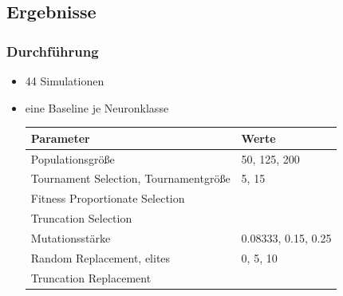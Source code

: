 \subsection{Ergebnisse}

\begin{frame}
  \frametitle{Durchführung}
  \begin{itemize}
  \item 44 Simulationen
  \item eine Baseline je Neuronklasse
    \scriptsize
    \begin{tabular}[H]{ll}
      Parameter & Werte \\\hline
      Populationsgröße & 50, 125, 200 \\ \arrayrulecolor{light-gray}\hline
      Tournament Selection, Tournamentgröße & 5, 15 \\
      Fitness Proportionate Selection & \\
      Truncation Selection  & \\ \hline
      Mutationsstärke & 0.08333, 0.15, 0.25 \\ \hline
      Random Replacement, elites & 0, 5, 10 \\
      Truncation Replacement & \\
    \end{tabular}
  \end{itemize}
\end{frame}


